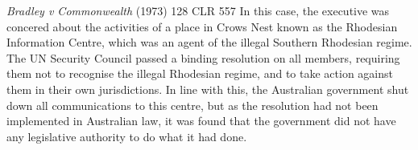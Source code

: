 \begin{casedetails}{\textit{Bradley v Commonwealth} (1973) 128 CLR 557}\label{case:Bradley v Commonwealth}
    \flushleft
    In this case, the executive was concered about the activities of a place in Crows Nest known as the Rhodesian Information Centre, which was an agent of the illegal Southern Rhodesian regime. The UN Security Council passed a binding resolution on all members, requiring them not to recognise the illegal Rhodesian regime, and to take action against them in their own jurisdictions. In line with this, the Australian government shut down all communications to this centre, but as the resolution had not been implemented in Australian law, it was found that the government did not have any legislative authority to do what it had done.
\end{casedetails}

